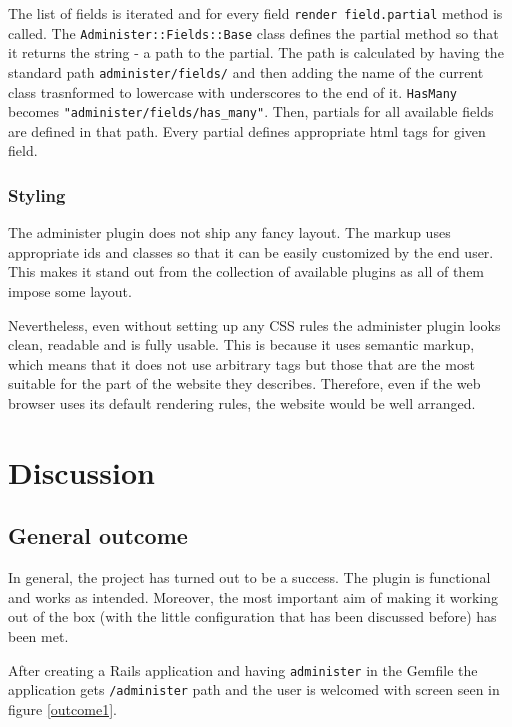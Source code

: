       The list of fields is iterated and for every field \texttt{render field.partial} method is called. The
      \texttt{Administer::Fields::Base} class defines the partial method so that it returns the string - a path
      to the partial. The path is calculated by having the standard path \texttt{administer/fields/} and then
      adding the name of the current class trasnformed to lowercase with underscores to the end of it.
      \texttt{HasMany} becomes \texttt{"administer/fields/has\_many"}. Then, partials for all
      available fields are defined in that path. Every partial defines appropriate html tags
      for given field.
      
    \subsubsection{Styling}
      The administer plugin does not ship any fancy layout. The markup uses appropriate
      ids and classes so that it can be easily customized by the end user. This makes it
      stand out from the collection of available plugins as all of them impose
      some layout. 
      
      Nevertheless, even without setting up any CSS rules the administer plugin looks
      clean, readable and is fully usable. This is because it uses semantic markup, which means
      that it does not use arbitrary tags but those that are the most suitable for the part of 
      the website they describes. Therefore, even if the web browser uses its 
      default rendering rules, the website would be well arranged.
      
  \section{Discussion}
    \subsection{General outcome}
      \label{ch:implementation:general_outcome}
      In general, the project has turned out to be a success. The plugin is functional
      and works as intended. Moreover, the most important aim of making it
      working out of the box (with the little configuration that has been discussed before)
      has been met. 
      
      After creating a Rails application and having \texttt{administer} in the Gemfile
      the application gets \texttt{/administer} path and the user is welcomed with screen
      seen in figure \ref{outcome1}. 
      
